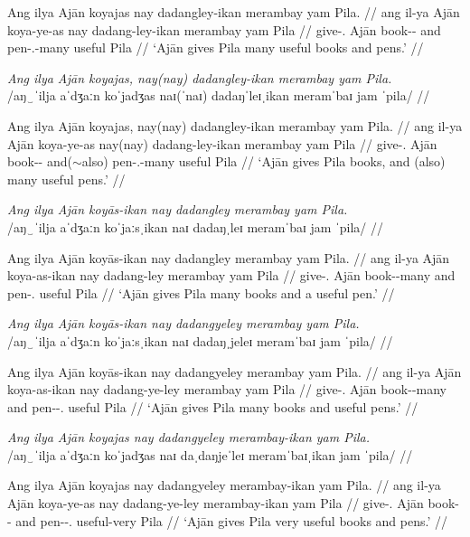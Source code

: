 \documentclass[12pt,a4paper]{scrartcl}
\newcommand{\PargI}{{\Parg}.{\Inan}}
\newcommand{\TsgM}{{\Tsg}.{\M}}
\newcommand{\til}{$\sim$} %
\begin{document}
\gla Ang ilya Ajān koyajas nay dadangley-ikan merambay yam Pila. //
\glb ang il-ya Ajān koya-ye-as nay dadang-ley-ikan merambay yam Pila //
\glc \AgtT{} give-\TsgM{} Ajān book-\Pl{}-\Parg{} and pen-\PargI{}-many useful \Dat{} Pila //
\glft `Ajān gives Pila many useful books and pens.' //
\endgl\xe

\ex\begingl
\glpreamble \textit{Ang ilya Ajān koyajas, nay(nay) dadangley-ikan merambay yam Pila.}\\
	/aŋ‿ˈilja aˈdʒaːn koˈjadʒas naɪ(ˈnaɪ) dadaŋˈleɪˌikan meramˈbaɪ jam ˈpila/ //

\gla Ang ilya Ajān koyajas, nay(nay) dadangley-ikan merambay yam Pila. //
\glb ang il-ya Ajān koya-ye-as nay(nay) dadang-ley-ikan merambay yam Pila //
\glc \AgtT{} give-\TsgM{} Ajān book-\Pl{}-\Parg{} and(\til{}also) pen-\PargI{}-many useful \Dat{} Pila //
\glft `Ajān gives Pila books, and (also) many useful pens.' //
\endgl\xe

\ex\begingl
\glpreamble \textit{Ang ilya Ajān koyās-ikan nay dadangley merambay yam Pila.}\\
	/aŋ‿ˈilja aˈdʒaːn koˈjaːsˌikan naɪ dadaŋˌleɪ meramˈbaɪ jam ˈpila/ //

\gla Ang ilya Ajān koyās-ikan nay dadangley merambay yam Pila. //
\glb ang il-ya Ajān koya-as-ikan nay dadang-ley merambay yam Pila //
\glc \AgtT{} give-\TsgM{} Ajān book-\Parg{}-many and pen-\PargI{} useful \Dat{} Pila //
\glft `Ajān gives Pila many books and a useful pen.' //
\endgl\xe

\ex\begingl
\glpreamble \textit{Ang ilya Ajān koyās-ikan nay dadangyeley merambay yam Pila.}\\
	/aŋ‿ˈilja aˈdʒaːn koˈjaːsˌikan naɪ dadaŋˌjeleɪ meramˈbaɪ jam ˈpila/ //

\gla Ang ilya Ajān koyās-ikan nay dadangyeley merambay yam Pila. //
\glb ang il-ya Ajān koya-as-ikan nay dadang-ye-ley merambay yam Pila //
\glc \AgtT{} give-\TsgM{} Ajān book-\Parg{}-many and pen-\Pl{}-\PargI{} useful \Dat{} Pila //
\glft `Ajān gives Pila many books and useful pens.' //
\endgl\xe

\ex\begingl
\glpreamble \textit{Ang ilya Ajān koyajas nay dadangyeley merambay-ikan yam Pila.}\\
	/aŋ‿ˈilja aˈdʒaːn koˈjadʒas naɪ daˌdaŋjeˈleɪ meramˈbaɪˌikan jam ˈpila/ //

\gla Ang ilya Ajān koyajas nay dadangyeley merambay-ikan yam Pila. //
\glb ang il-ya Ajān koya-ye-as nay dadang-ye-ley merambay-ikan yam Pila //
\glc \AgtT{} give-\TsgM{} Ajān book-\Pl{}-\Parg{} and pen-\Pl{}-\PargI{} useful-very \Dat{} Pila //
\glft `Ajān gives Pila very useful books and pens.' //
\endgl\xe
\end{document}
